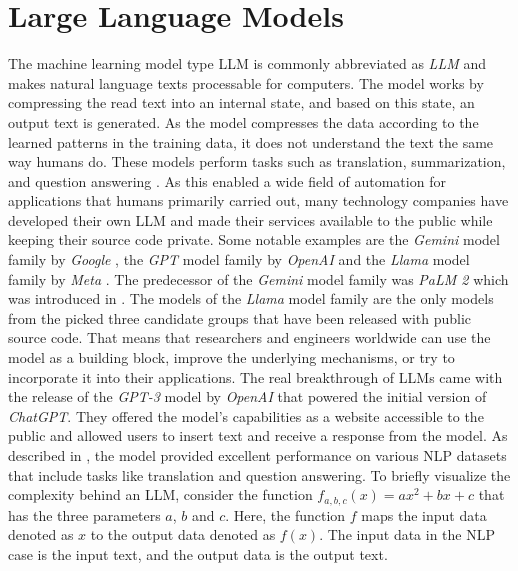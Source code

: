 \documentclass[draft,final]{thesisclass} %
\begin{document}
\section{Large Language Models}
The machine learning model type \gls{LLM} is commonly abbreviated as \textit{LLM} and makes natural language texts processable for computers.
The model works by compressing the read text into an internal state, and based on this state, an output text is generated.
As the model compresses the data according to the learned patterns in the training data, it does not understand the text the same way humans do.
These models perform tasks such as translation, summarization, and question answering \parencite[1]{llm_literature_review}.
As this enabled a wide field of automation for applications that humans primarily carried out, many technology companies have developed their own \gls{LLM} and made their services available to the public while keeping their source code private.
Some notable examples are the \textit{Gemini} model family by \textit{Google} \parencite{gemini} \parencite{gemini_1.5} \parencite{gemini_flash}, the \textit{GPT} model family by \textit{OpenAI} \parencite{gpt3} \parencite{gpt4} \parencite{gpt4_turbo} \parencite{gpt4o} and the \textit{Llama} model family by \textit{Meta} \parencite{llama2} \parencite{llama3}. The predecessor of the \textit{Gemini} model family was \textit{PaLM 2} which was introduced in \textcite{palm2}.
The models of the \textit{Llama} model family are the only models from the picked three candidate groups that have been released with public source code.
That means that researchers and engineers worldwide can use the model as a building block, improve the underlying mechanisms, or try to incorporate it into their applications.
The real breakthrough of \gls{LLM}s came with the release of the \textit{GPT-3} model by \textit{OpenAI} \parencite{gpt3} that powered the initial version of \textit{ChatGPT}.
They offered the model's capabilities as a website accessible to the public and allowed users to insert text and receive a response from the model.
As described in \textcite[1]{gpt3}, the model provided excellent performance on various \acs{NLP} datasets that include tasks like translation and question answering.
To briefly visualize the complexity behind an \gls{LLM}, consider the function $f_{a,b,c}(x) = ax^2+bx+c$ that has the three parameters $a$, $b$ and $c$.
Here, the function $f$ maps the input data denoted as $x$ to the output data denoted as $f(x)$.
The input data in the \acs{NLP} case is the input text, and the output data is the output text.
\end{document}

